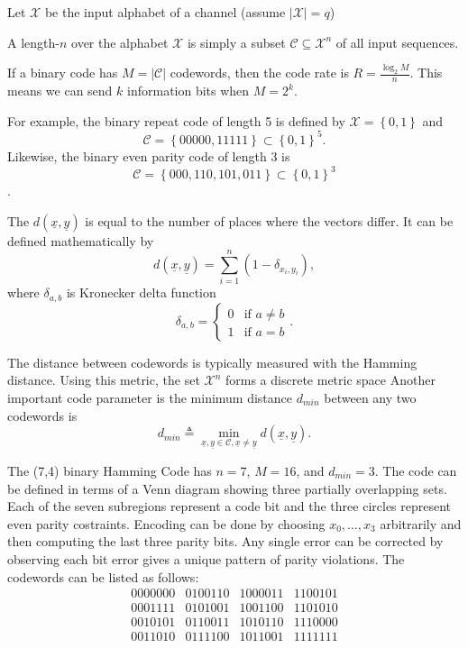Let $\mathcal{X}$ be the input alphabet of a channel (assume $\left|\mathcal{X}\right|=q$)
\begin{definition}
A length-$n$  over the alphabet $\mathcal{X}$ is simply a subset $\mathcal{C}\subseteq\mathcal{X}^{n}$ of all input sequences.
\end{definition}
If a binary code has $M=\left|\mathcal{C}\right|$ codewords, then the code rate is $R=\frac{\log_{2}M}{n}$.
This means we can send $k$ information bits when $M=2^k$.

For example, the binary repeat code of length 5 is defined by $\mathcal{X}=\left\{ 0,1\right\}$ and
\[\mathcal{C}=\left\{ 00000,11111\right\} \subset\left\{ 0,1\right\} ^{5}. \]
Likewise, the binary even parity code of length 3 is
\[ \mathcal{C}=\left\{ 000,110,101,011\right\} \subset\left\{ 0,1\right\} ^{3} \].

\begin{definition}
The  $d(\underline{x},\underline{y})$ is equal to the number of places where the vectors differ.
It can be defined mathematically by
\[ d(\underline{x},\underline{y}) = \sum_{i=1}^{n}( 1- \delta_{x_{i},y_{i}}), \]
where $\delta_{a,b}$ is Kronecker delta function
\[\delta_{a,b}=\begin{cases}
0 & \mbox{if }a\neq b\\
1 & \mbox{if }a=b\end{cases}. \]
\end{definition}

The distance between codewords is typically measured with the Hamming distance.
Using this metric, the set $\mathcal{X}^{n}$ forms a discrete metric space
Another important code parameter is the minimum distance $d_{min}$ between any two
codewords is
\[ d_{min}\triangleq\min_{\underline{x},\underline{y}\in\mathcal{C},\underline{x}\neq\underline{y}}d(\underline{x},\underline{y}).\]

\begin{example}
The (7,4) binary Hamming Code has $n=7$, $M=16$, and $d_{min}=3$.
The code can be defined in terms of a Venn diagram showing three partially overlapping sets.
Each of the seven subregions represent a code bit and the three circles represent even parity costraints.
Encoding can be done by choosing $x_0,\ldots,x_3$ arbitrarily and then computing the last three parity bits.
Any single error can be corrected by observing each bit error gives a unique pattern of parity violations.
The codewords can be listed as follows:
\[\begin{array}{cccc}
0000000 & 0100110 & 1000011 & 1100101\\
0001111 & 0101001 & 1001100 & 1101010\\
0010101 & 0110011 & 1010110 & 1110000\\
0011010 & 0111100 & 1011001 & 1111111
\end{array} \]
\end{example}

